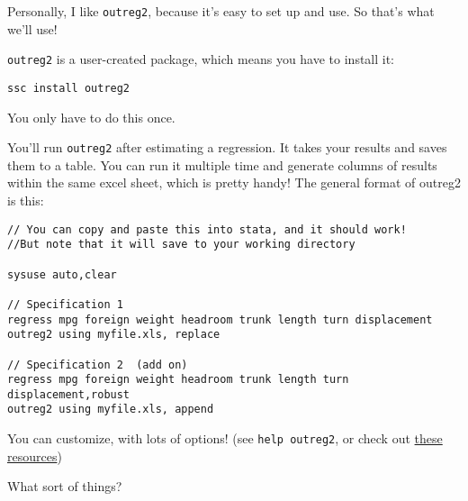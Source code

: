 \documentclass[11pt]{article}
\begin{document}
Personally, I like \texttt{outreg2}, because it's easy to set up and
use. So that's what we'll use!

\texttt{outreg2} is a user-created package, which means you have to
install it:

\begin{verbatim}
ssc install outreg2
\end{verbatim}

You only have to do this once.

You'll run \texttt{outreg2} after estimating a regression. It takes your
results and saves them to a table. You can run it multiple time and
generate columns of results within the same excel sheet, which is pretty
handy! The general format of outreg2 is this:

\begin{verbatim}
// You can copy and paste this into stata, and it should work! 
//But note that it will save to your working directory

sysuse auto,clear

// Specification 1
regress mpg foreign weight headroom trunk length turn displacement
outreg2 using myfile.xls, replace 

// Specification 2  (add on)
regress mpg foreign weight headroom trunk length turn displacement,robust
outreg2 using myfile.xls, append 
\end{verbatim}

You can customize, with lots of options! (see \texttt{help\ outreg2}, or
check out \href{https://thedatahall.com/stata-outreg2-part1/}{these
resources})

What sort of things?
\end{document}
